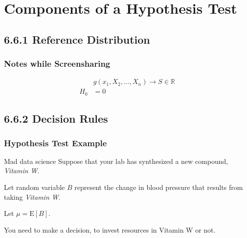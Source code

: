\documentclass[12pt, block=fill]{beamer}
\newcommand{\E}{\text{E}}
\begin{document}
\section{Components of a Hypothesis Test}

\subsection{6.6.1 Reference Distribution}

\begin{frame}[t]
  \frametitle{Notes while Screensharing}

  \[
  \begin{aligned}
    & g(x_{1}, X_{2}, \dots, X_{n}) \rightarrow S \in \mathbb{R} \\
    H_{0} &= 0
  \end{aligned}
  \]
\end{frame}

\subsection{6.6.2 Decision Rules}

\begin{frame}
  \frametitle{Hypothesis Test Example}

  \begin{exampleblock}{Mad data science}
    Suppose that your lab has synthesized a new compound, 
    \textit{Vitamin W}.

    Let random variable $B$ represent the change in blood pressure that results from taking
    \textit{Vitamin W}.
    
    Let $\mu = \E[B]$.

    You need to make a decision, to invest resources in Vitamin W or not. 
  \end{exampleblock}
  

 \end{frame}
\end{document}

